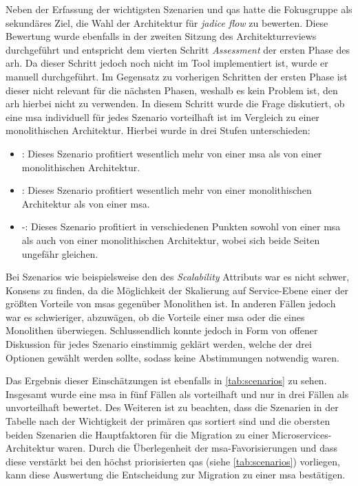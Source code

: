 Neben der Erfassung der wichtigsten Szenarien und \glspl{qa} hatte die Fokusgruppe als sekundäres Ziel, die Wahl der Architektur für \emph{jadice flow} zu bewerten.
Diese Bewertung wurde ebenfalls in der zweiten Sitzung des Architekturreviews durchgeführt und entspricht dem vierten Schritt \emph{Assessment} der ersten Phase des \gls{arh}.
Da dieser Schritt jedoch noch nicht im Tool implementiert ist, wurde er manuell durchgeführt.
Im Gegensatz zu vorherigen Schritten der ersten Phase ist dieser nicht relevant für die nächsten Phasen, weshalb es kein Problem ist, den \gls{arh} hierbei nicht zu verwenden.
In diesem Schritt wurde die Frage diskutiert, ob eine \acrlong{msa} individuell für jedes Szenario vorteilhaft ist im Vergleich zu einer monolithischen Architektur.
Hierbei wurde in drei Stufen unterschieden:
\begin{itemize}
	\item \advantage\hspace*{0.1cm}: Dieses Szenario profitiert wesentlich mehr von einer \gls{msa} als von einer monolithischen Architektur.
	\item \disadvantage\hspace*{0.1cm}: Dieses Szenario profitiert wesentlich mehr von einer monolithischen Architektur als von einer \gls{msa}.
	\item \hspace*{0.27cm}-\hspace*{0.27cm}: Dieses Szenario profitiert in verschiedenen Punkten sowohl von einer \gls{msa} als auch von einer monolithischen Architektur, wobei sich beide Seiten ungefähr gleichen.
\end{itemize}
Bei Szenarios wie beispielsweise den des \emph{Scalability} Attributs war es nicht schwer, Konsens zu finden, da die Möglichkeit der Skalierung auf Service-Ebene einer der größten Vorteile von \glspl{msa} gegenüber Monolithen ist.
In anderen Fällen jedoch war es schwieriger, abzuwägen, ob die Vorteile einer \gls{msa} oder die eines Monolithen überwiegen.
Schlussendlich konnte jedoch in Form von offener  Diskussion für jedes Szenario einstimmig geklärt werden, welche der drei Optionen gewählt werden sollte, sodass keine Abstimmungen notwendig waren.

Das Ergebnis dieser Einschätzungen ist ebenfalls in \cref{tab:scenarios} zu sehen.
Insgesamt wurde eine \gls{msa} in fünf Fällen als vorteilhaft und nur in drei Fällen als unvorteilhaft bewertet.
Des Weiteren ist zu beachten, dass die Szenarien in der Tabelle nach der Wichtigkeit der primären \glspl{qa} sortiert sind und die obersten beiden Szenarien die Hauptfaktoren für die Migration zu einer Microservices-Architektur waren.
Durch die Überlegenheit der \gls{msa}-Favorisierungen und dass diese verstärkt bei den höchst priorisierten \glspl{qa} (siehe \cref{tab:scenarios}) vorliegen, kann diese Auswertung die Entscheidung zur Migration zu einer \gls{msa} bestätigen.


